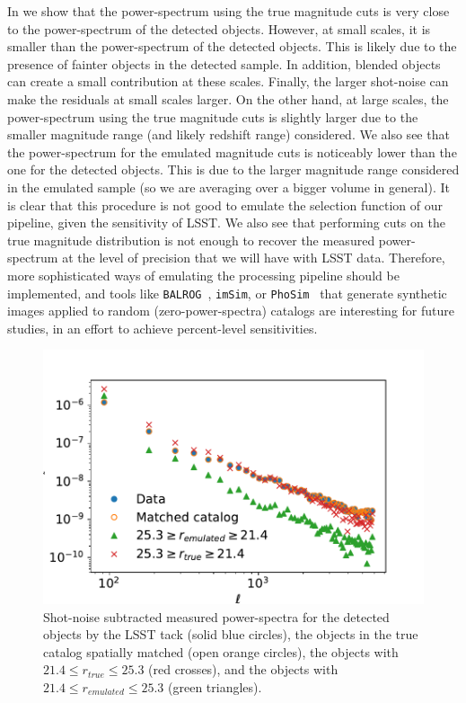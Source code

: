 \documentclass[twocolumn]{aastex62}
\begin{document}
In  we show that the power-spectrum using the true magnitude cuts is very close to the power-spectrum of the detected objects. However, at small scales, it is smaller than the power-spectrum of the detected objects. This is likely due to the presence of fainter objects in the detected  sample. In addition, blended objects can create a small contribution at these scales. Finally, the larger shot-noise can make the residuals at small scales larger. On the other hand, at large scales, the power-spectrum using the true magnitude cuts is slightly larger due to the smaller magnitude range (and likely redshift range) considered. We also see that the power-spectrum for the emulated magnitude cuts is noticeably lower than the one for the detected objects. This is due to the larger magnitude range considered in the emulated sample (so we are averaging over a bigger volume in general). It is clear that this procedure is not good to emulate the selection function of our pipeline, given the sensitivity of LSST. We also see that performing cuts on the true magnitude distribution is not enough to recover the measured power-spectrum at the level of precision that we will have with LSST data. Therefore, more sophisticated ways of emulating the processing pipeline should be implemented, and tools like \texttt{BALROG}~\citep{2016MNRAS.457..786S}, \texttt{imSim}, or \texttt{PhoSim}~\citep{2015ApJS..218...14P} that generate synthetic images applied to random (zero-power-spectra) catalogs are interesting for future studies, in an effort to achieve percent-level sensitivities.
\begin{figure}
\centering
\includegraphics[width=0.9\columnwidth]{emulated_power_spectra}
\caption{Shot-noise subtracted measured power-spectra for the detected objects by the LSST tack (solid blue circles), the objects in the true catalog spatially matched (open orange circles), the objects with $21.4 \leq r_{true} \leq 25.3$ (red crosses), and the objects with $21.4 \leq r_{emulated} \leq 25.3$ (green triangles).}
\label{fig:emulated_power}
\end{figure}
\end{document}
